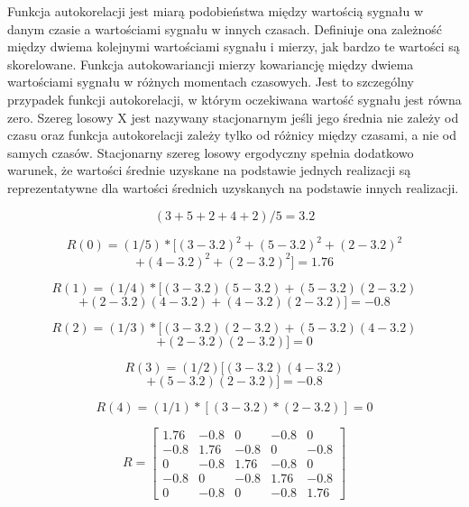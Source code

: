 \documentclass[10pt,a4paper,twoside,twocolumn]{article}%
\begin{document}
\begin{mdframed}
    Funkcja autokorelacji jest miarą podobieństwa między wartością sygnału w danym
    czasie a wartościami sygnału w innych czasach. Definiuje ona zależność między
    dwiema kolejnymi wartościami sygnału i mierzy, jak bardzo te wartości są
    skorelowane. Funkcja autokowariancji mierzy kowariancję między dwiema
    wartościami sygnału w różnych momentach czasowych. Jest to szczególny przypadek
    funkcji autokorelacji, w którym oczekiwana wartość sygnału jest równa zero.
    Szereg losowy X jest nazywany stacjonarnym jeśli jego średnia nie zależy od
    czasu oraz funkcja autokorelacji zależy tylko od różnicy między czasami, a nie
    od samych czasów. Stacjonarny szereg losowy ergodyczny spełnia dodatkowo warunek,
    że wartości średnie uzyskane na podstawie jednych realizacji są reprezentatywne
    dla wartości średnich uzyskanych na podstawie innych realizacji.
    
    $$(3+5+2+4+2)/5 = 3.2$$
    
    $$R(0) = (1/5) * [(3-3.2)^2 + (5-3.2)^2 + (2-3.2)^2$$$$ + (4-3.2)^2 + (2-3.2)^2] = 1.76$$
    
    $$R(1) = (1/4) * [(3-3.2)(5-3.2) + (5-3.2)(2-3.2)$$$$ + (2-3.2)(4-3.2) + (4-3.2)(2-3.2)] = -0.8$$
    
    $$R(2) = (1/3) * [(3-3.2)(2-3.2) + (5-3.2)(4-3.2)$$$$ + (2-3.2)(2-3.2)] = 0$$
    
    $$R(3) = (1/2) [(3-3.2)(4-3.2)$$$$ + (5-3.2)(2-3.2)] = -0.8$$
    
    $$R(4) = (1/1) * [(3-3.2)*(2-3.2)] = 0$$

    $$R = \begin{bmatrix}
        1.76 & -0.8 & 0 & -0.8 & 0 \\
        -0.8 & 1.76 & -0.8 & 0 & -0.8 \\
        0 & -0.8 & 1.76 & -0.8 & 0 \\
        -0.8 & 0 & -0.8 & 1.76 & -0.8 \\
        0 & -0.8 & 0 & -0.8 & 1.76
        \end{bmatrix}$$
        

\end{mdframed}
\end{document}
